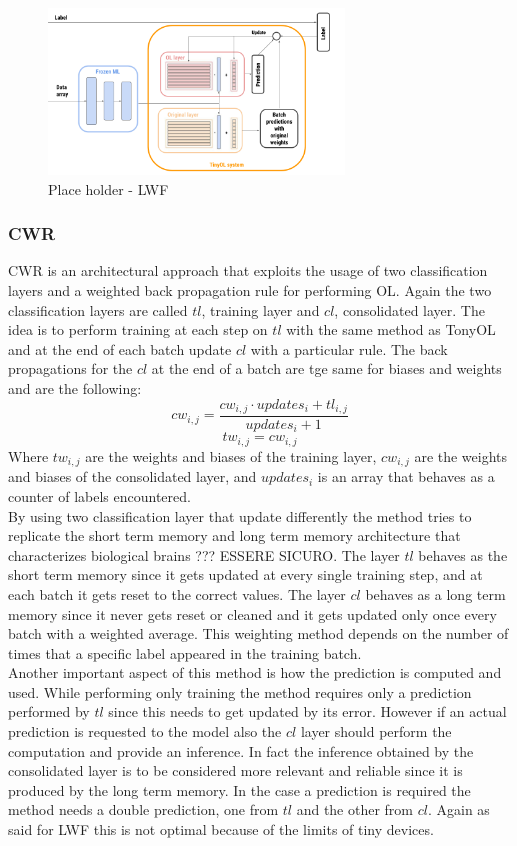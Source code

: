\documentclass[12pt]{report}
\begin{document}
\begin{figure}[h!]
    \centering
    \includegraphics[width=0.7\textwidth]{Figures/Chapter3/LWF.png} 
    \caption{Place holder - LWF}
    \label{fig:block_diag_LWF}    
\end{figure}

\subsubsection{CWR}
CWR is an architectural approach that exploits the usage of two classification layers and a weighted back propagation rule for performing OL. Again the two classification layers are called $tl$, training layer and $cl$, consolidated layer. The idea is to perform training at each step on $tl$ with the same method as TonyOL and at the end of each batch update $cl$ with a particular rule. The back propagations for the $cl$ at the end of a batch are tge same for biases and weights and are the following:
    \[     cw_{i,j} =  \frac{cw_{i,j} \cdot updates_{i} + tl_{i,j}}{updates_{i} + 1} \] 
    \[     tw_{i,j} =  cw_{i,j}\] 
Where $tw_{i,j}$ are the weights and biases of the training layer, $cw_{i,j}$ are the weights and biases of the consolidated layer, and $updates_{i}$ is an array that behaves as a counter of labels encountered.\\
By using two classification layer that update differently the method tries to replicate the short term memory and long term memory architecture that characterizes biological brains ??? ESSERE SICURO. The layer $tl$ behaves as the short term memory since it gets updated at every single training step, and at each batch it gets reset to the correct values. The layer $cl$ behaves as a long term memory since it never gets reset or cleaned and it gets updated only once every batch with a weighted average. This weighting method depends on the number of times that a specific label appeared in the training batch.\\
Another important aspect of this method is how the prediction is computed and used. While performing only training the method requires only a prediction performed by $tl$ since this needs to get updated by its error. However if an actual prediction is requested to the model also the $cl$ layer should perform the computation and provide an inference. In fact the inference obtained by the consolidated layer is to be considered more relevant and reliable since it is produced by the long term memory. In the case a prediction is required the method needs a double prediction, one from $tl$ and the other from $cl$. Again as said for LWF this is not optimal because of the limits of tiny devices. \\
\end{document}
